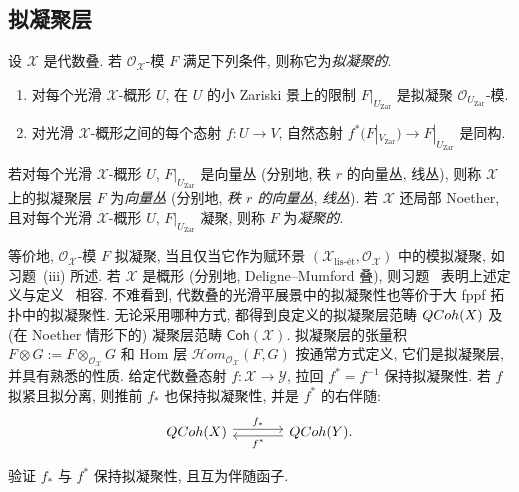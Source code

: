 \subsection{拟凝聚层}\label{src:7.1.2-subsection}
\begin{definition}\label{src:7.1.7}
设 $\mathcal X$ 是代数叠. 若 $\mathcal O_{\mathcal X}$-模 $F$ 满足下列条件, 则称它为\emph{拟凝聚的}.
\begin{enumerate}[(1)]
\item 对每个光滑 $\mathcal X$-概形 $U$, 在 $U$ 的小 Zariski 景上的限制 $F|_{U_{\mathrm{Zar}}}$ 是拟凝聚 $\mathcal O_{U_{\mathrm{Zar}}}$-模.
\item 对光滑 $\mathcal X$-概形之间的每个态射 $f:U\to V$, 自然态射 $f^*(F|_{V_{\mathrm{Zar}}})\to F|_{U_{\mathrm{Zar}}}$ 是同构.
\end{enumerate}
若对每个光滑 $\mathcal X$-概形 $U$, $F|_{U_{\mathrm{Zar}}}$ 是向量丛 (分别地, 秩 $r$ 的向量丛, 线丛), 则称 $\mathcal X$ 上的拟凝聚层 $F$ 为\emph{向量丛} (分别地, \emph{秩 $r$ 的向量丛}, \emph{线丛}). 若 $\mathcal X$ 还局部 Noether, 且对每个光滑 $\mathcal X$-概形 $U$, $F|_{U_{\mathrm{Zar}}}$ 凝聚, 则称 $F$ 为\emph{凝聚的}.
\end{definition}
等价地, $\mathcal O_{\mathcal X}$-模 $F$ 拟凝聚, 当且仅当它作为赋环景 $(\mathcal X_{\text{lis-ét}},\mathcal O_{\mathcal X})$ 中的模拟凝聚, 如习题~(iii) 所述. 若 $\mathcal X$ 是概形 (分别地, Deligne--Mumford 叠), 则习题~ 表明上述定义与定义~ 相容. 不难看到, 代数叠的光滑平展景中的拟凝聚性也等价于大 fppf 拓扑中的拟凝聚性. 无论采用哪种方式, 都得到良定义的拟凝聚层范畴 $QCoh(X)$ 及 (在 Noether 情形下的) 凝聚层范畴 $\mathsf{Coh}(\mathcal X)$. 拟凝聚层的张量积 $F\otimes G:=F\otimes_{\mathcal O_{\mathcal X}}G$ 和 Hom 层 $\mathcal H\!om_{\mathcal O_{\mathcal X}}(F,G)$ 按通常方式定义, 它们是拟凝聚层, 并具有熟悉的性质.
给定代数叠态射 $f:\mathcal X\to\mathcal Y$, 拉回 $f^*=f^{-1}$ 保持拟凝聚性. 若 $f$ 拟紧且拟分离, 则推前 $f_*$ 也保持拟凝聚性, 并是 $f^*$ 的右伴随:
\[
\begin{tikzcd}[ampersand replacement=\&,column sep=large]
\QCoh(\mathcal X)\arrow[r,shift left,"{f_*}"]\&\QCoh(\mathcal Y)\arrow[l,shift left,"{f^*}"] .
\end{tikzcd}
\]
\begin{exercise}[细节]\label{src:7.1.8}
验证 $f_*$ 与 $f^*$ 保持拟凝聚性, 且互为伴随函子.
\end{exercise}
